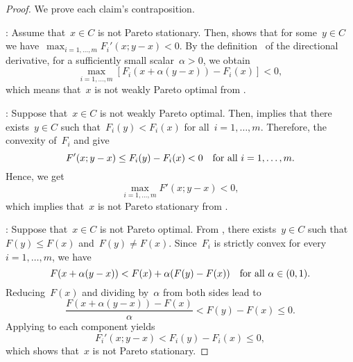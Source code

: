\documentclass[../main]{subfiles}
\begin{document}
\begin{proof}
    We prove each claim's contraposition.

    :
    Assume that~$x \in C$ is not Pareto stationary.
    Then,  shows that for some~$y \in C$ we have~$\max_{i = 1, \dots, m} F_i'(x; y - x) < 0$.
    By the definition~ of the directional derivative, for a sufficiently small scalar~$\alpha > 0$, we obtain
    \begin{equation}
        \max_{i = 1, \dots, m} [ F_i(x + \alpha (y - x)) - F_i(x) ] < 0 
    ,\end{equation} 
    which means that~$x$ is not weakly Pareto optimal from .

    :
    Suppose that~$x \in C$ is not weakly Pareto optimal.
    Then,  implies that there exists~$y \in C$ such that~$F_i(y) < F_i(x)$ for all~$i = 1, \dots, m$.
    Therefore, the convexity of~$F_i$ and  give
    \begin{equation}
        F'(x; y - x) \le F_i(y) - F_i(x) < 0 \quad \text{for all~$i = 1, \dots, m$}
    .\end{equation} 
    Hence, we get
    \begin{equation}
        \max_{i = 1, \dots, m} F'(x; y - x) < 0
    ,\end{equation} 
    which implies that~$x$ is not Pareto stationary from .

    :
    Suppose that~$x \in C$ is not Pareto optimal.
    From , there exists~$y \in C$ such that~$F(y) \le F(x)$ and~$F(y) \neq F(x)$.
    Since~$F_i$ is strictly convex for every~$i = 1, \dots, m$, we have
    \begin{equation}
        F(x + \alpha(y - x)) < F(x) + \alpha (F(y) - F(x)) \quad \text{for all~$\alpha \in (0, 1)$}
    .\end{equation} 
    Reducing~$F(x)$ and dividing by~$\alpha$ from both sides lead to
    \begin{equation}
        \frac{F(x + \alpha(y - x)) - F(x)}{\alpha} < F(y) - F(x) \le 0
    .\end{equation} 
    Applying  to each component yields
    \begin{equation}
        F_i'(x; y - x) < F_i(y) - F_i(x) \le 0
    ,\end{equation} 
    which shows that~$x$ is not Pareto stationary.
\end{proof}
\end{document}
